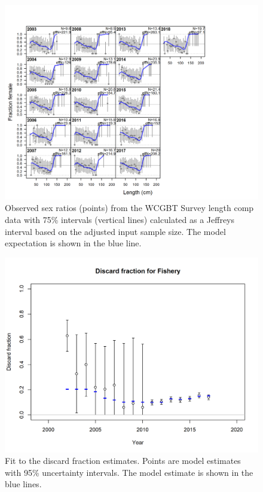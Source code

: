 \documentclass[12pt,]{article}
\begin{document}
\begin{figure}
\centering
\includegraphics{r4ss/plots_mod1/sexratio_len_flt5mkt0.png}
\caption{Observed sex ratios (points) from the WCGBT Survey length comp
data with 75\% intervals (vertical lines) calculated as a Jeffreys
interval based on the adjusted input sample size. The model expectation
is shown in the blue line.\label{fig:sexratio_len_flt5mkt0}}
\end{figure}

\begin{figure}
\centering
\includegraphics{r4ss/plots_mod1/discard_fitFishery.png}
\caption{Fit to the discard fraction estimates. Points are model
estimates with 95\% uncertainty intervals. The model estimate is shown
in the blue lines.\label{fig:discard_fitFishery}}
\end{figure}
\end{document}
